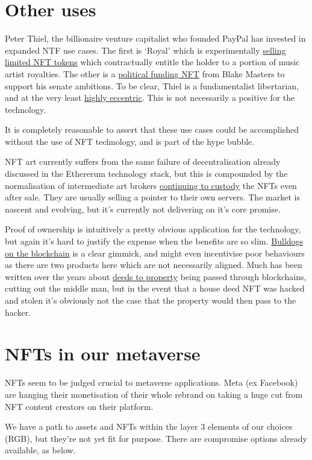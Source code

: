 \section{Other uses}
Peter Thiel, the billionaire venture capitalist who founded PayPal has invested in expanded NTF use cases. The first is `Royal' which is experimentally \href{https://royal.io/}{selling limited NFT tokens} which contractually entitle the holder to a portion of music artist royalties. The other is a \href{https://www.ztonft.com/}{political funding NFT} from Blake Masters to support his senate ambitions. To be clear, Thiel is a fundamentalist libertarian, and at the very least \href{https://gizmodo.com/peter-thiel-bitcoin-talk-miami-2022-1848764790}{highly eccentric}. This is not necessarily a positive for the technology. \par
It is completely reasonable to assert that these use cases could be accomplished without the use of NFT technology, and is part of the hype bubble.\par
NFT art currently suffers from the same failure of decentralisation already discussed in the Ethererum technology stack, but this is compounded by the normalisation of intermediate art brokers \href{https://moxie.org/2022/01/07/web3-first-impressions.html}{continuing to custody} the NFTs even after sale. They are usually selling a pointer to their own servers. The market is nascent and evolving, but it's currently not delivering on it's core promise.\par
Proof of ownership is intuitively a pretty obvious application for the technology, but again it's hard to justify the expense when the benefits are so slim. \href{https://www.bullishlybred.com/}{Bulldogs on the blockchain} is a clear gimmick, and might even incentivise poor behaviours as there are two products here which are not necessarily aligned. Much has been written over the years about \href{https://propy.com/browse/propy-nft/}{deeds to property} being passed through blockchains, cutting out the middle man, but in the event that a house deed NFT was hacked and stolen it's obviously not the case that the property would then pass to the hacker.

\section{NFTs in our metaverse}
NFTs seem to be judged crucial to metaverse applications. Meta (ex Facebook) are hanging their monetisation of their whole rebrand on taking a huge cut from NFT content creators on their platform.\par
We have a path to assets and NFTs within the layer 3 elements of our choices (RGB), but they're not yet fit for purpose. There are compromise options already available, as below.
